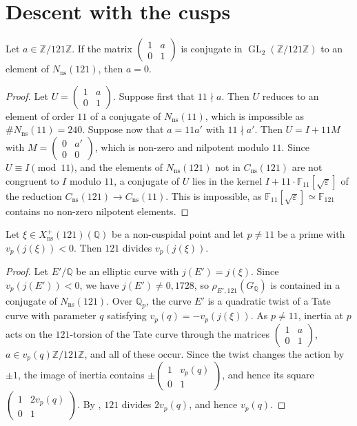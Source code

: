 \documentclass[11pt,reqno]{amsart}
\DeclareMathOperator{\GL}{GL}
\newcommand{\Q}{\mathbb{Q}}
\newcommand{\Z}{\mathbb{Z}}
\newcommand{\F}{\mathbb{F}}
\newcommand{\ns}{\mathrm{ns}}
\newcommand{\Xns}[1]{X_{\ns}^+(#1)}
\theoremstyle{definition}
\numberwithin{equation}{section}
\begin{document}
\section{Descent with the cusps}\label{sec:descent}

\begin{lemma}\label{lem:unipotent}
Let $a\in\Z/121\Z$. If the matrix $\begin{pmatrix}1&a\\0&1\end{pmatrix}$ is conjugate in $\GL_2(\Z/121\Z)$ to an element of $N_{\ns}(121)$, then $a=0$.
\end{lemma}

\begin{proof}
Let $U=\begin{pmatrix}1&a\\0&1\end{pmatrix}$. Suppose first that $11\nmid a$. Then $U$ reduces to an element of order $11$ of a conjugate of $N_{\ns}(11)$, which is impossible as $\#N_{\ns}(11)=240$. Suppose now that $a=11a'$ with $11\nmid a'$. Then $U=I+11M$ with $M=\begin{pmatrix}0&a'\\0&0\end{pmatrix}$, which is non-zero and nilpotent modulo $11$. Since $U\equiv I \pmod{11}$, and the elements of $N_{\ns}(121)$ not in $C_{\ns}(121)$ are not congruent to $I$ modulo $11$, a conjugate of $U$ lies in the kernel $I+11\cdot \F_{11}[\sqrt\varepsilon]$ of the reduction $C_{\ns}(121)\rightarrow C_{\ns}(11)$. This is impossible, as $\F_{11}[\sqrt\varepsilon]\simeq \F_{121}$ contains no non-zero nilpotent elements.
\end{proof}

\begin{lemma}\label{lem:tate}
Let $\xi\in \Xns{121}(\Q)$ be a non-cuspidal point and let $p\neq 11$ be a prime with $v_p(j(\xi))<0$. Then $121$ divides $v_p(j(\xi))$.
\end{lemma}

\begin{proof}
Let $E'/\Q$ be an elliptic curve with $j(E')=j(\xi)$. Since $v_p(j(E'))<0$, we have $j(E')\neq 0,1728$, so $\rho_{E',121}(G_\Q)$ is contained in a conjugate of $N_{\ns}(121)$. Over $\Q_p$, the curve $E'$ is a quadratic twist of a Tate curve with parameter $q$ satisfying $v_p(q)=-v_p(j(\xi))$. As $p\neq 11$, inertia at $p$ acts on the $121$-torsion of the Tate curve through the matrices $\begin{pmatrix}1&a\\0&1\end{pmatrix}$, $a\in v_p(q)\Z/121\Z$, and all of these occur. Since the twist changes the action by $\pm 1$, the image of inertia contains $\pm\begin{pmatrix}1&v_p(q)\\0&1\end{pmatrix}$, and hence its square $\begin{pmatrix}1&2v_p(q)\\0&1\end{pmatrix}$. By , $121$ divides $2v_p(q)$, and hence $v_p(q)$.
\end{proof}
\end{document}
